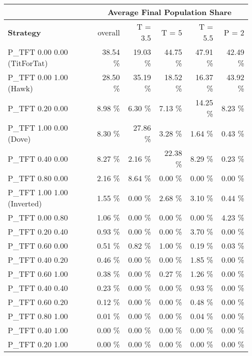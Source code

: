 \begin{tabular}{|l|r|r|r|r|r|}
\hline
 & \multicolumn{5}{c|}{{\bf Average Final Population Share}} \\
\hline
{\bf Strategy} & overall &  T = 3.5 & T = 5 & T = 5.5 & P = 2\\ \hline
P\_TFT 0.00 0.00 (TitForTat)  &   38.54 \%  &   19.03 \%  &   44.75 \%  &   47.91 \%  &   42.49 \% \\
P\_TFT 0.00 1.00 (Hawk)       &   28.50 \%  &   35.19 \%  &   18.52 \%  &   16.37 \%  &   43.92 \% \\
P\_TFT 0.20 0.00              &    8.98 \%  &    6.30 \%  &    7.13 \%  &   14.25 \%  &    8.23 \% \\
P\_TFT 1.00 0.00 (Dove)       &    8.30 \%  &   27.86 \%  &    3.28 \%  &    1.64 \%  &    0.43 \% \\
P\_TFT 0.40 0.00              &    8.27 \%  &    2.16 \%  &   22.38 \%  &    8.29 \%  &    0.23 \% \\
P\_TFT 0.80 0.00              &    2.16 \%  &    8.64 \%  &    0.00 \%  &    0.00 \%  &    0.00 \% \\
P\_TFT 1.00 1.00 (Inverted)   &    1.55 \%  &    0.00 \%  &    2.68 \%  &    3.10 \%  &    0.44 \% \\
P\_TFT 0.00 0.80              &    1.06 \%  &    0.00 \%  &    0.00 \%  &    0.00 \%  &    4.23 \% \\
P\_TFT 0.20 0.40              &    0.93 \%  &    0.00 \%  &    0.00 \%  &    3.70 \%  &    0.00 \% \\
P\_TFT 0.60 0.00              &    0.51 \%  &    0.82 \%  &    1.00 \%  &    0.19 \%  &    0.03 \% \\
P\_TFT 0.40 0.20              &    0.46 \%  &    0.00 \%  &    0.00 \%  &    1.85 \%  &    0.00 \% \\
P\_TFT 0.60 1.00              &    0.38 \%  &    0.00 \%  &    0.27 \%  &    1.26 \%  &    0.00 \% \\
P\_TFT 0.40 0.40              &    0.23 \%  &    0.00 \%  &    0.00 \%  &    0.93 \%  &    0.00 \% \\
P\_TFT 0.60 0.20              &    0.12 \%  &    0.00 \%  &    0.00 \%  &    0.48 \%  &    0.00 \% \\
P\_TFT 0.80 1.00              &    0.01 \%  &    0.00 \%  &    0.00 \%  &    0.04 \%  &    0.00 \% \\
P\_TFT 0.40 1.00              &    0.00 \%  &    0.00 \%  &    0.00 \%  &    0.00 \%  &    0.00 \% \\
P\_TFT 0.20 1.00              &    0.00 \%  &    0.00 \%  &    0.00 \%  &    0.00 \%  &    0.00 \% \\

\end{tabular}
